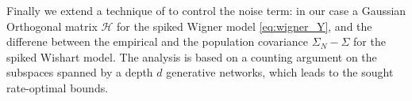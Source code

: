 Finally we extend a technique of \cite{HHHV18} to control 
the noise term: in our case a Gaussian Orthogonal matrix $\mathcal{H}$ for the spiked Wigner model \eqref{eq:wigner_Y}, and the differene between the empirical and the population covariance $\Sigma_N - \Sigma$ for the spiked Wishart model. 
The analysis is based on a counting argument on the subspaces spanned by a depth $d$ generative networks, which leads to the sought rate-optimal bounds.